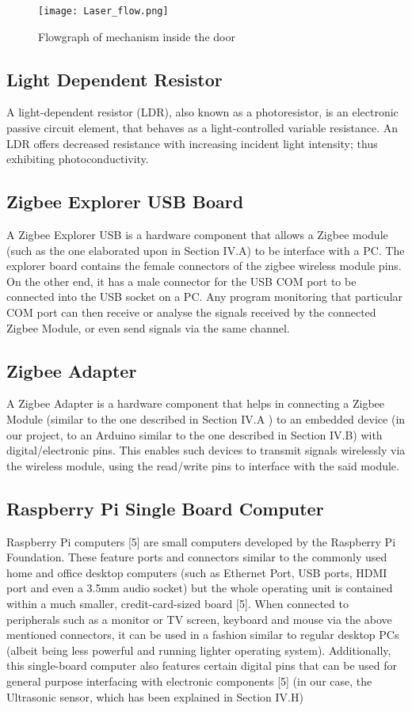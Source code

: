 \documentclass[letterpaper, 10 pt, conference]{ieeeconf}
\begin{document}
\begin{figure}[h!]
\centering
\texttt{[image: Laser\_flow.png]}
\caption{\label{fig:ipfinal}Flowgraph of mechanism inside the door}
\end{figure}

\subsection{Light Dependent Resistor}
A light-dependent resistor (LDR), also known as a photoresistor, is an electronic passive circuit element, that behaves as a light-controlled variable resistance. An LDR offers decreased resistance with increasing incident light intensity; thus exhibiting photoconductivity.

\subsection{Zigbee Explorer USB Board}
A Zigbee Explorer USB is a hardware component that allows a Zigbee module (such as the one elaborated upon in Section IV.A) to be interface with a PC. The explorer board contains the female connectors of the zigbee wireless module pins. On the other end, it has a male connector for the USB COM port to be connected into the USB socket on a PC. Any program monitoring that particular COM port can then receive or analyse the signals received by the connected Zigbee Module, or even send signals via the same channel.
\subsection{Zigbee Adapter}
A Zigbee Adapter is a hardware component that helps in connecting a Zigbee Module (similar to the one described in Section IV.A ) to an embedded device (in our project, to an Arduino similar to the one described in Section IV.B) with digital/electronic pins. This enables such devices to transmit signals wirelessly via the wireless module, using the read/write pins to interface with the said module.


\subsection{Raspberry Pi Single Board Computer}
Raspberry Pi computers [5] are small computers developed by the Raspberry Pi Foundation. These feature ports and connectors similar to the commonly used home and office desktop computers (such as Ethernet Port, USB ports, HDMI port and even a 3.5mm audio socket) but the whole operating unit is contained within a much smaller, credit-card-sized board [5]. When connected to peripherals such as a monitor  or TV screen, keyboard and mouse via the above mentioned connectors, it can be used in a fashion similar to regular desktop PCs (albeit being less powerful and running lighter operating system). Additionally, this single-board computer also features certain digital pins that can be used for general purpose interfacing with electronic components [5] (in our case, the Ultrasonic sensor, which has been explained in Section IV.H)
\end{document}
